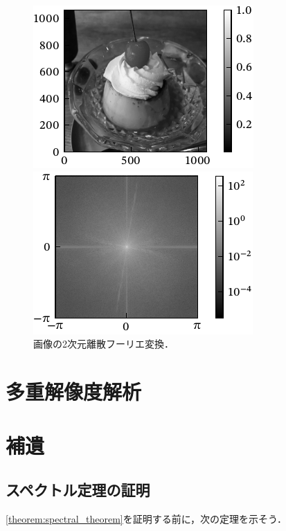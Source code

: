 \documentclass[../../main]{subfiles}
\begin{document}
\begin{figure}[htbp]
  \begin{minipage}{\linewidth/2}
    \centering
    \includegraphics{figures/pudding.pdf}
  \end{minipage}%
  \begin{minipage}{\linewidth/2}
    \centering
    \includegraphics{figures/pudding_dft.pdf}
  \end{minipage}
  \caption{画像の2次元離散フーリエ変換．}
\end{figure}

\section{多重解像度解析}

\section{補遺}

\subsection{スペクトル定理の証明}
\label{subsection:proof_of_the_spectral_theorem}

\cref{theorem:spectral_theorem}を証明する前に，次の定理を示そう．
\end{document}
